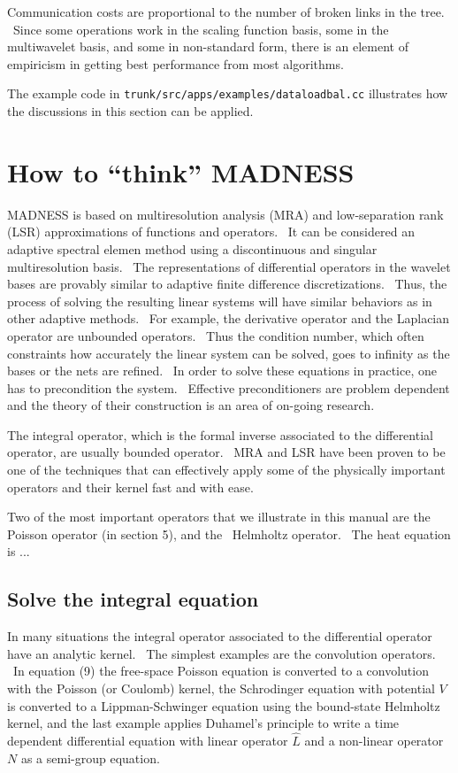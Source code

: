 Communication costs are proportional to the number of broken links in the tree. \ Since some operations work in the
scaling function basis, some in the multiwavelet basis, and some in non-standard form, there is an element of
empiricism in getting best performance from most algorithms. 

The example code in \texttt{trunk/src/apps/examples/dataloadbal.cc} illustrates how the discussions in this section can
be applied.

\section{How to ``think'' MADNESS}
MADNESS is based on multiresolution analysis (MRA) and low-separation rank (LSR) approximations of functions and
operators. \ It can be considered an adaptive spectral elemen method using a discontinuous and singular multiresolution
basis. \ The representations of differential operators in the wavelet bases are provably similar to adaptive finite
difference discretizations. \ Thus, the process of solving the resulting linear systems will have similar behaviors as
in other adaptive methods. \ For example, the derivative operator and the Laplacian operator are unbounded operators.
\ Thus the condition number, which often constraints how accurately the linear system can be solved, goes to infinity
as the bases or the nets are refined. \ In order to solve these equations in practice, one has to precondition the
system. \ Effective preconditioners are problem dependent and the theory of their construction is an area of on-going
research.

The integral operator, which is the formal inverse associated to the differential operator, are usually bounded
operator. \ MRA and LSR have been proven to be one of the techniques that can effectively apply some of the physically
important operators and their kernel fast and with ease.

Two of the most important operators that we illustrate in this manual are the Poisson operator (in section 5), and the
\ Helmholtz operator. \ The heat equation is ...

\subsection{Solve the integral equation}
In many situations the integral operator associated to the differential operator have an analytic kernel. \ The simplest
examples are the convolution operators. \ In equation (9) the free-space Poisson equation is converted to a convolution
with the Poisson (or Coulomb) kernel, the Schrodinger equation with potential  $V$ is converted to a Lippman-Schwinger
equation using the bound-state Helmholtz kernel, and the last example applies Duhamel's principle to write a time
dependent differential equation with linear operator  $\hat{L}$ and a non-linear operator  $N$ as a semi-group
equation.


